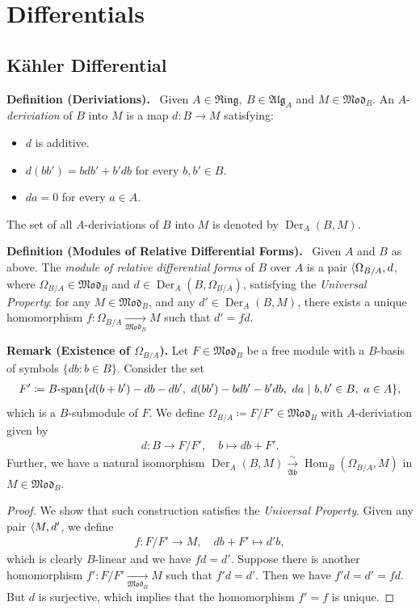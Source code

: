 \documentclass[11pt,a4paper,footinclude=true,headinclude=true]{scrbook} %
\DeclareMathOperator{\Hom}{Hom}
\DeclareMathOperator{\Der}{Der}
\newcommand{\Ab}{\mathfrak{Ab}}
\newcommand{\Ring}{\mathfrak{Ring}}
\newcommand{\<}{\langle}
\let\>\relax
\newcommand{\>}{\rangle}
\newcommand{\isolongto}{\overset{\sim}{\longrightarrow}}
\newcommand{\spn}{\mathchar`-\mathrm{span}}
\newcommand{\MOD}{\mathfrak{Mod}}
\newcommand{\ALG}{\mathfrak{Alg}}
\newenvironment{definition}[2][Definition]
    { \begin{mdframed}[backgroundcolor=gray!20] \textbf{#1 #2.}\ }
    {  \end{mdframed}}
\newenvironment{remark}[2][Remark]
    { \begin{mdframed}[backgroundcolor=gray!20] \textbf{#1 #2.} }
    {  \end{mdframed}}
\begin{document}
\chapter{Differentials}
\section{K\"{a}hler Differential}
\begin{definition}{(Deriviations)}
    Given $A\in\Ring,\ B\in\ALG_A$ and $M\in\MOD_B$. An $A$-\textit{deriviation} of $B$ into $M$ is a map $d:B\to M$ satisfying:
    \begin{itemize}
        \item[(D1)] $d$ is additive.
        \item[(D2)] $d(bb')=bdb'+b'db$ for every $b,b'\in B$.
        \item[(D3)] $da=0$ for every $a\in A$.
    \end{itemize}
    The set of all $A$-deriviations of $B$ into $M$ is denoted by $\Der_A(B,M)$.
\end{definition}

\begin{definition}{(Modules of Relative Differential Forms)}
    Given $A$ and $B$ as above. The \textit{module of relative differential forms} of $B$ over $A$ is a pair $\<\Omega_{B/A},d\>$, where $\Omega_{B/A}\in\MOD_B$ and $d\in\Der_A(B,\Omega_{B/A})$, satisfying the \textit{Universal Property}: for any $M\in\MOD_B$, and any $d'\in\Der_A(B,M)$, there exists a unique homomorphism $f:\Omega_{B/A}\xrightarrow[\MOD_B]{}M$ such that $d'=fd$.
\end{definition}

\begin{remark}{(Existence of $\Omega_{B/A}$)}
    Let $F\in\MOD_B$ be a free module with a $B$-basis of symbols $\{db:b\in B\}$. Consider the set
    \begin{align*}
        F'\coloneqq B\spn\{d(b+b')-db-db',\ d(bb')-bdb'-b'db,\ da\ |\ b,b'\in B,\ a\in A\},
    \end{align*}
    which is a $B$-submodule of $F$. We define $\Omega_{B/A}\coloneqq F/F'\in\MOD_B$ with $A$-deriviation given by
    \begin{align*}
        d:B\longrightarrow F/F',\quad b\longmapsto db+F'.
    \end{align*}
    Further, we have a natural isomorphism $\Der_A(B,M)\underset{\Ab}{\isolongto}\Hom_B(\Omega_{B/A},M)$ in $M\in\MOD_B$.
\end{remark}
\begin{proof}
    We show that such construction satisfies the \textit{Universal Property}. Given any pair $\<M,d'\>$, we define
    \begin{align*}
        f:F/F'\longrightarrow M,\quad db+F'\longmapsto d'b,
    \end{align*}
    which is clearly $B$-linear and we have $fd=d'$. Suppose there is another homomorphism $f':F/F'\xrightarrow[\MOD_B]{}M$ such that $f'd=d'$. Then we have $f'd=d'=fd$. But $d$ is surjective, which implies that the homomorphism $f'=f$ is unique.
\end{proof}
\end{document}
